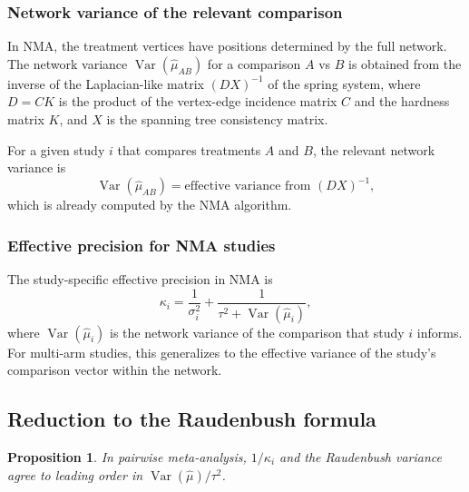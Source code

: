 \documentclass[12pt]{article}
\newcommand{\Var}{\operatorname{Var}}
\newtheorem{proposition}{Proposition}
\begin{document}
\subsubsection{Network variance of the relevant comparison}

In NMA, the treatment vertices have positions determined by the full
network.  The network variance $\Var(\hat\mu_{AB})$ for a comparison
$A$ vs $B$ is obtained from the inverse of the Laplacian-like matrix
$(DX)^{-1}$ of the spring system, where $D = CK$ is the product of the
vertex-edge incidence matrix $C$ and the hardness matrix $K$, and $X$
is the spanning tree consistency matrix.

For a given study $i$ that compares treatments $A$ and $B$, the
relevant network variance is
\begin{equation}\label{eq:netvar}
  \Var(\hat\mu_{AB}) = \text{effective variance from } (DX)^{-1},
\end{equation}
which is already computed by the NMA algorithm.

\subsubsection{Effective precision for NMA studies}

The study-specific effective precision in NMA is
\begin{equation}\label{eq:keff_nma}
  \kappa_i = \frac{1}{\sigma_i^2}
           + \frac{1}{\tau^2 + \Var(\hat\mu_i)},
\end{equation}
where $\Var(\hat\mu_i)$ is the network variance of the comparison
that study $i$ informs.  For multi-arm studies, this generalizes to the
effective variance of the study's comparison vector within the network.

\subsection{Reduction to the Raudenbush formula}

\begin{proposition}\label{prop:raudenbush}
In pairwise meta-analysis, $1/\kappa_i$ and the Raudenbush variance
agree to leading order in $\Var(\hat\mu)/\tau^2$.
\end{proposition}
\end{document}
